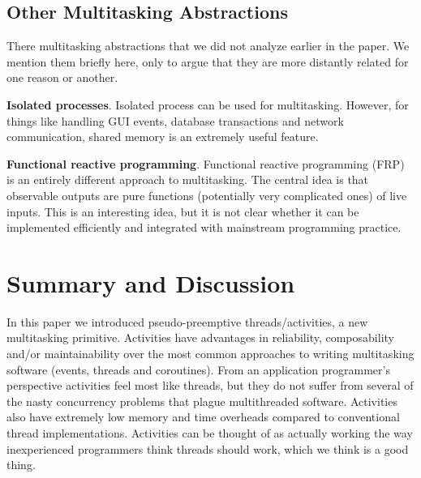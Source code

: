 \documentclass[pldi,10pt,preprint]{sigplanconf-pldi16}
\begin{document}



\subsection{Other Multitasking Abstractions}

There multitasking abstractions that we did not analyze earlier in the paper.
We mention them briefly here, only to argue that they are more distantly related for one reason or another.

\textbf{Isolated processes}.
Isolated process can be used for multitasking.
However, for things like handling GUI events, database transactions and network communication, shared memory is an extremely useful feature.

\textbf{Functional reactive programming}.
Functional reactive programming (FRP) is an entirely different approach to multitasking.
The central idea is that observable outputs are pure functions (potentially very complicated ones) of live inputs.
This is an interesting idea, but it is not clear whether it can be implemented efficiently and integrated with mainstream programming practice.



\section{Summary and Discussion}

In this paper we introduced pseudo-preemptive threads/activities, a new multitasking primitive.
Activities have advantages in reliability, composability and/or maintainability over the most common approaches to writing multitasking software (events, threads and coroutines).
From an application programmer's perspective activities feel most like threads, but they do not suffer from several of the nasty concurrency problems that plague multithreaded software.
Activities also have extremely low memory and time overheads compared to conventional thread implementations.
Activities can be thought of as actually working the way inexperienced programmers think threads should work, which we think is a good thing.
\end{document}
